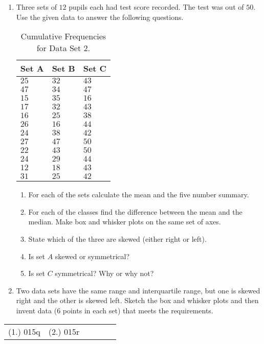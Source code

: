 {
\begin{enumerate}
\item Three sets of $12$ pupils each had test score recorded. The test was out of $50$. Use the given data to answer the following questions.
\begin{table}[htb]
\begin{center}
\begin{tabular}{|l|l|l|}
\hline
Set A & Set B & Set C \bigstrut \\ 
\hline
$25$ & $32$ & $43$ \\
$47$ & $34$ & $47$ \\
$15$ & $35$ & $16$ \\
$17$ & $32$ & $43$ \\
$16$ & $25$ & $38$ \\
$26$ & $16$ & $44$ \\
$24$ & $38$ & $42$ \\
$27$ & $47$ & $50$ \\
$22$ & $43$ & $50$ \\
$24$ & $29$ & $44$ \\
$12$ & $18$ & $43$ \\
$31$ & $25$ & $42 $\\
\hline
\end{tabular}
\caption{Cumulative Frequencies for Data Set 2. \label{tab:mdat:s:cumulativeds2}}
\end{center}
\end{table}
\begin{enumerate}
\item For each of the sets calculate the mean and the five number summary.
\item For each of the classes find the difference between the mean and the median. Make box and whisker plots on the same set of axes.
\item State which of the three are skewed (either right or left).
\item Is set $A$ skewed or symmetrical? 
\item Is set $C$ symmetrical? Why or why not?
\end{enumerate}
\item Two data sets have the same range and interquartile range, but one is skewed right and the other is skewed left. Sketch the box and whisker plots and then invent data ($6$ points in each set) that meets the requirements.
\end{enumerate}


\par \practiceinfo
\par \begin{tabular}[h]{cccccc}
(1.)	015q	&
(2.)	015r	&
\end{tabular}}

